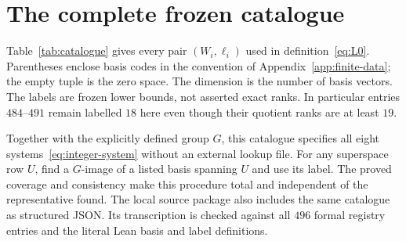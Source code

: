 \section{The complete frozen catalogue}\label{app:catalogue}

Table~\ref{tab:catalogue} gives every pair $(W_i,\ell_i)$ used in
definition~\eqref{eq:L0}. Parentheses enclose basis codes in the convention
of Appendix~\ref{app:finite-data}; the empty tuple is the zero space.
The dimension is the number of basis vectors. The labels are frozen
lower bounds, not asserted exact ranks. In particular entries
$484$--$491$ remain labelled $18$ here even though their quotient ranks
are at least $19$.

Together with the explicitly defined group $G$, this catalogue specifies
all eight systems~\eqref{eq:integer-system} without an external lookup
file. For any superspace row $U$, find a $G$-image of a listed basis
spanning $U$ and use its label. The proved coverage and consistency make
this procedure total and independent of the representative found.
The local source package also includes the same catalogue as structured
JSON. Its transcription is checked against all $496$ formal registry
entries and the literal Lean basis and label definitions.


